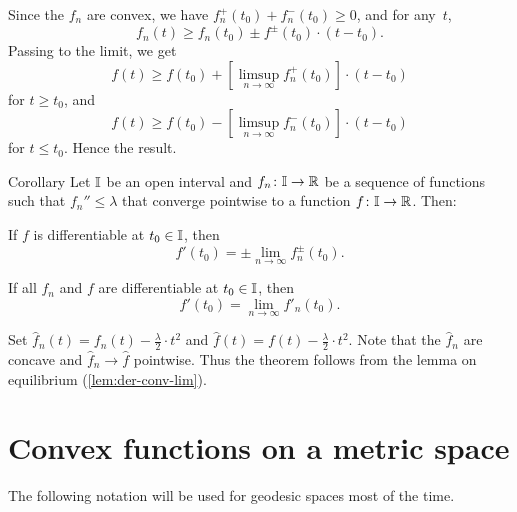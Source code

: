 Since the $f_n$ are convex, we have $f^+_n(t_0)+f^-_n(t_0)\ge0$, and for any~$t$,
\[f_n(t)\ge f_n(t_0)\pm f^\pm(t_0)\cdot (t-t_0).\]
Passing to the limit, we get
\[f(t)\ge f(t_0)+\left[\limsup_{n\to\infty}f^+_n(t_0)\right]\cdot (t-t_0)\]
for $t\ge t_0$, and 
\[f(t)\ge f(t_0)-\left[\limsup_{n\to\infty}f^-_n(t_0)\right]\cdot (t-t_0)\]
for $t\le t_0$.
Hence the result.
\qeds

\begin{thm}{Corollary}
\label{cor:der-conv-lim}
Let $\mathbb{I}$ be an open interval 
and $f_n\:\II\to\RR$ be a sequence of functions such that $f_n''\le \lambda$ that converge pointwise to a function $f\:\II\to\RR$.
Then: 
\begin{subthm}{} If $f$ is differentiable at $t_0\in \II$, then
\[f'(t_0)=\pm\lim_{n\to\infty} f^\pm_n(t_0).\]
\end{subthm}

\begin{subthm}{} If all $f_n$ and $f$ are differentiable at $t_0\in \II$, then
\[f'(t_0)=\lim_{n\to\infty} f'_n(t_0).\]
\end{subthm}
\end{thm}

 Set $\hat f_n(t)=f_n(t)-\tfrac{\lambda}{2}\cdot t^2$ and $\hat f(t)=f(t)-\tfrac\lambda2\cdot t^2$.
Note that the $\hat f_n$ are concave and $\hat f_n\to \hat f$ pointwise.
Thus the theorem follows from the lemma on equilibrium (\ref{lem:der-conv-lim}).\qeds











\section{Convex functions on a metric space}\label{sec:conv-fun}

The following notation will be used for geodesic spaces most of the time.

